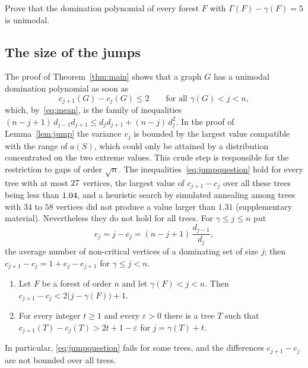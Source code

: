 \begin{problem}
Prove that the domination polynomial of every forest $F$ with
$\Gamma(F)-\gamma(F)=5$ is unimodal.
\end{problem}

\subsection*{The size of the jumps}
The proof of Theorem~\ref{thm:main} shows that a graph $G$ has a unimodal
domination polynomial as soon as
\begin{equation}\label{eq:jumpquestion}
  c_{j+1}(G)-c_j(G)\le 2\qquad\text{for all } \gamma(G)<j<n ,
\end{equation}
which, by~\eqref{eq:mean}, is the family of inequalities
$(n-j+1)\,d_{j-1}d_{j+1}\le d_jd_{j+1}+(n-j)\,d_j^2$. In the proof of
Lemma~\ref{lem:jump} the variance $v_j$ is bounded by the largest value
compatible with the range of $a(S)$, which could only be attained by a
distribution concentrated on the two extreme values. This crude step is
responsible for the restriction to gaps of order $\sqrt n$.
The inequalities~\eqref{eq:jumpquestion} hold for every tree with at most
$27$ vertices, the largest value of $c_{j+1}-c_j$ over all these trees
being less than $1.04$, and a heuristic search by simulated annealing
among trees with $34$ to $58$ vertices did not produce a value larger than
$1.31$ (supplementary material). Nevertheless they do not hold for all
trees. For $\gamma\le j\le n$ put
\[
  e_j=j-c_j=(n-j+1)\,\frac{d_{j-1}}{d_j},
\]
the average number of non-critical vertices of a dominating set of size $j$;
then $c_{j+1}-c_j=1+e_j-e_{j+1}$ for $\gamma\le j<n$.

\begin{proposition}\label{prop:jumps}
\begin{enumerate}
\item[\textup{(i)}] Let $F$ be a forest of order $n$ and let
$\gamma(F)<j<n$. Then $c_{j+1}-c_j<2\bigl(j-\gamma(F)\bigr)+1$.
\item[\textup{(ii)}] For every integer $t\ge1$ and every $\varepsilon>0$ there
is a tree $T$ such that $c_{j+1}(T)-c_j(T)>2t+1-\varepsilon$ for
$j=\gamma(T)+t$.
\end{enumerate}
In particular, \eqref{eq:jumpquestion} fails for some trees, and the
differences $c_{j+1}-c_j$ are not bounded over all trees.
\end{proposition}

